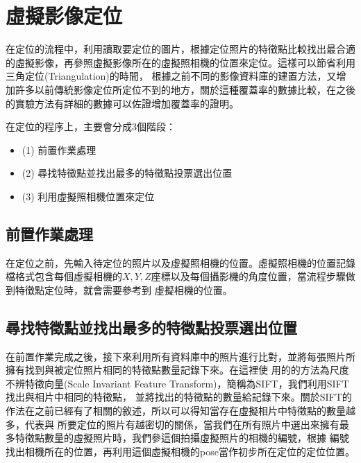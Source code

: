 \section{虛擬影像定位}

%
	在定位的流程中，利用讀取要定位的圖片，根據定位照片的特徵點比較找出最合適的虛擬影像，再參照虛擬影像所在的虛擬照相機的位置來定位。這樣可以節省利用三角定位(Triangulation)的時間，
	根據之前不同的影像資料庫的建置方法，又增加許多以前傳統影像定位所定位不到的地方，關於這種覆蓋率的數據比較，在之後的實驗方法有詳細的數據可以佐證增加覆蓋率的證明。
	
	在定位的程序上，主要會分成3個階段：
		\begin{itemize}
			\item (1) 前置作業處理
    		\item (2) 尋找特徵點並找出最多的特徵點投票選出位置
    		\item (3) 利用虛擬照相機位置來定位
		\end{itemize} 
	
	
\subsection{前置作業處理}	

	在定位之前，先輸入待定位的照片以及虛擬照相機的位置。虛擬照相機的位置記錄檔格式包含每個虛擬相機的$X,Y,Z$座標以及每個攝影機的角度位置，當流程步驟做到特徵點定位時，就會需要參考到
	虛擬相機的位置。
		
\subsection{尋找特徵點並找出最多的特徵點投票選出位置}	

	在前置作業完成之後，接下來利用所有資料庫中的照片進行比對，並將每張照片所擁有找到與被定位照片相同的特徵點數量記錄下來。在這裡使
	用的的方法為尺度不辨特徵向量(Scale Invariant Feature Transform)，簡稱為SIFT，我們利用SIFT找出與相片中相同的特徵點，
	並將找出的特徵點的數量給記錄下來。關於SIFT的作法在之前已經有了相關的敘述，所以可以得知當存在虛擬相片中特徵點的數量越多，代表與
	所要定位的照片有越密切的關係，當我們在所有照片中選出來擁有最多特徵點數量的虛擬照片時，我們參這個拍攝虛擬照片的相機的編號，根據
	編號找出相機所在的位置，再利用這個虛擬相機的pose當作初步所在定位的定位位置。
	
	
